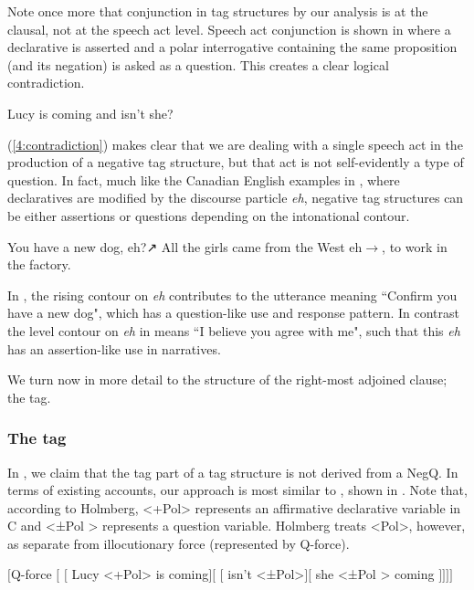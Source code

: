 \documentclass[output=paper,colorlinks,citecolor=brown]{langscibook}
\begin{document}
Note once more that conjunction in tag structures by our analysis is at the clausal, not at the speech act level. Speech act conjunction is shown in  where a declarative is asserted and a polar interrogative containing the same proposition (and its negation) is asked as a question. This creates a clear logical contradiction. 

\ea {\#}Lucy is coming and isn't she?\label{4:contradiction}
\z

(\ref{4:contradiction}) makes clear that we are dealing with a single speech act in the production of a negative tag structure, but that act is not self-evidently a type of question. In fact, much like the Canadian English examples in , where declaratives are modified by the discourse particle \textit{eh}, negative tag structures can be either assertions or questions depending on the intonational contour.

\ea You have a new dog, eh?↗\label{4:canadianrise}
\ex All the girls came from the West eh$\rightarrow$, to work in the factory. \label{4:canadianlevel} \\\phantom{a} 
\z
{}

In , the rising contour on \textit{eh} contributes to the utterance meaning ``Confirm you have a new dog", which has a question-like use and response pattern. In contrast the level contour on \textit{eh} in  means ``I believe you agree with me", such that this \textit{eh} has an assertion-like use in narratives.

We turn now in more detail to the structure of the right-most adjoined clause; the tag.

\subsubsection{The tag}\label{sect:tagpart}

In , we claim that the tag part of a tag structure is not derived from a NegQ. In terms of existing accounts, our approach is most similar to \citet{holmberg2016}, shown in . Note that, according to Holmberg, <+Pol> represents an affirmative declarative variable in C and <±Pol > represents a question variable. Holmberg treats <Pol>, however, as separate from illocutionary force (represented by Q-force). 

\ea	 $[$Q-force $[$ $[$ Lucy <+Pol> is coming$] [$ $[$ isn't <±Pol>$] [$ she <±Pol > coming $]]]]$\\\phantom{a}  \label{holmbergtag}
\z
\end{document}
